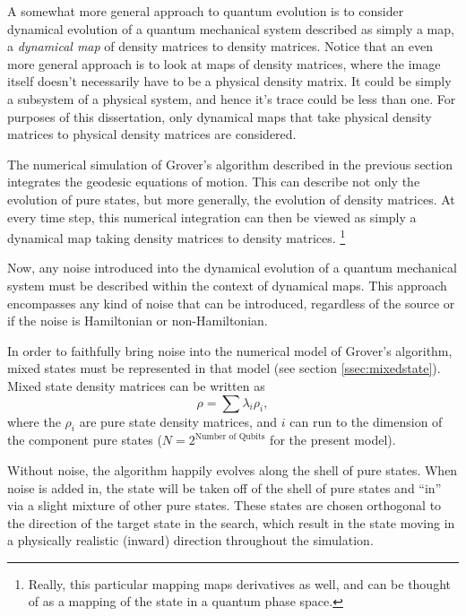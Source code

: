 A somewhat more general approach to quantum evolution is to 
consider dynamical evolution of a quantum mechanical system
described as simply a map, a \emph{dynamical 
map}\cite{Gorini/Kossakowski/Sudarshan:76}
of density matrices to density matrices.
Notice that an even more general approach is to look at maps of 
density matrices, where the image itself doesn't necessarily have to
be a physical density matrix.  It could be simply a subsystem
of a physical system, and hence it's trace could be less than
one.  For purposes of this dissertation, only dynamical maps that
take physical density matrices to physical density matrices are
considered.

The numerical simulation of Grover's algorithm described 
in the previous section integrates the geodesic equations 
of motion.  This can describe not only the evolution of pure states, 
but more generally, the evolution of density matrices.  
At every time step,
this numerical integration can then be viewed as simply a dynamical
map taking density matrices to density matrices.
\footnote{Really, this particular mapping maps derivatives as well, and
can be thought of as a mapping of the state in a quantum phase 
space.}

Now, any noise introduced into the dynamical evolution of a 
quantum mechanical system must be described within the context 
of dynamical maps.   This approach encompasses any kind of noise
that can be introduced, regardless of the source or if the noise
is Hamiltonian or non-Hamiltonian.

In order to faithfully bring noise into the numerical model of Grover's 
algorithm, mixed states must be represented in that model
(see section \ref{ssec:mixedstate}).  
Mixed state density matrices can be written as
\begin{equation}
\rho = \sum\lambda_i\rho_i,
\end{equation}
where the $\rho_i$ are pure state density matrices, and $i$ can run 
to the dimension of the component pure 
states ($N=2^{\text{Number of Qubits}}$ for the present model). 

Without noise,
the algorithm happily evolves along the shell of pure states.
When noise is added in, the state will be taken off of the shell 
of pure states and ``in'' via a slight mixture of other pure states.
These states are chosen orthogonal to the direction of the target
state in the search, which result in the state moving in a physically
realistic (inward) direction throughout the simulation.

